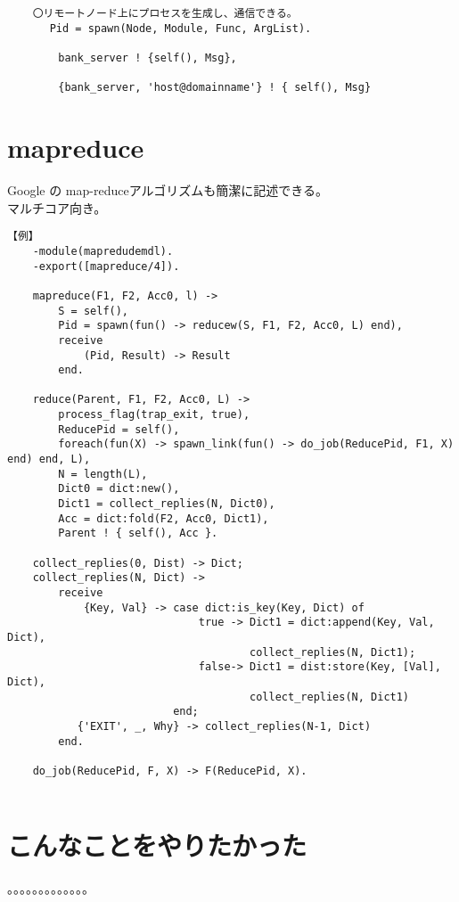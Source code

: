 \begin{verbatim}
    〇リモートノード上にプロセスを生成し、通信できる。
    　 Pid = spawn(Node, Module, Func, ArgList).
    
        bank_server ! {self(), Msg},
    
        {bank_server, 'host@domainname'} ! { self(), Msg}
\end{verbatim}



\section{mapreduce}

  Google の map-reduceアルゴリズムも簡潔に記述できる。\\
  マルチコア向き。

\begin{verbatim}
【例】
    -module(mapredudemdl).
    -export([mapreduce/4]).
    
    mapreduce(F1, F2, Acc0, l) ->
        S = self(),
        Pid = spawn(fun() -> reducew(S, F1, F2, Acc0, L) end),
        receive
            (Pid, Result) -> Result
        end.
    
    reduce(Parent, F1, F2, Acc0, L) ->
        process_flag(trap_exit, true),
        ReducePid = self(),
        foreach(fun(X) -> spawn_link(fun() -> do_job(ReducePid, F1, X) end) end, L),
        N = length(L),
        Dict0 = dict:new(),
        Dict1 = collect_replies(N, Dict0),
        Acc = dict:fold(F2, Acc0, Dict1),
        Parent ! { self(), Acc }.
    
    collect_replies(0, Dist) -> Dict;
    collect_replies(N, Dict) ->
        receive
            {Key, Val} -> case dict:is_key(Key, Dict) of
                              true -> Dict1 = dict:append(Key, Val, Dict),
                                      collect_replies(N, Dict1);
                              false-> Dict1 = dist:store(Key, [Val], Dict),
                                      collect_replies(N, Dict1)
                          end;
           {'EXIT', _, Why} -> collect_replies(N-1, Dict)
        end.
    
    do_job(ReducePid, F, X) -> F(ReducePid, X).
    
\end{verbatim}


\section{こんなことをやりたかった}

。。。。。。。。。。。。。



